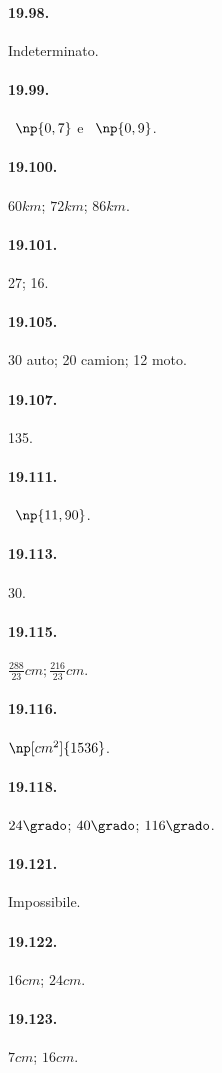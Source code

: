 \begin{multicols}{2}
\paragraph{19.98.} Indeterminato.

\paragraph{19.99.} \officialeuro~$\np{0,7}$ e \officialeuro~$\np{0,9}$.

\paragraph{19.100.} $60\unit{km}$; $72\unit{km}$; $86\unit{km}$.

\paragraph{19.101.} 27; 16.

\paragraph{19.105.} 30 auto; 20 camion; 12 moto.

\paragraph{19.107.} 135.

\paragraph{19.111.} \officialeuro~$\np{11,90}$.

\paragraph{19.113.} 30.

\paragraph{19.115.} $\frac{288}{23}\unit{cm};\frac{216}{23}\unit{cm}$.

\paragraph{19.116.} $\np[cm^2]{1536}$.

\paragraph{19.118.} $24\grado$; $40\grado$; $116\grado$.

\paragraph{19.121.} Impossibile.

\paragraph{19.122.} $16\unit{cm}$; $24\unit{cm}$.

\paragraph{19.123.} $7\unit{cm}$; $16\unit{cm}$.
\end{multicols}
